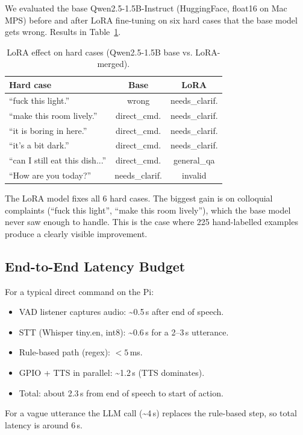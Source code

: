 \documentclass[conference]{IEEEtran}
\begin{document}
We evaluated the base Qwen2.5-1.5B-Instruct (HuggingFace, float16 on Mac MPS) before and after LoRA fine-tuning on six hard cases that the base model gets wrong. Results in Table~\ref{tab:lora}.

\begin{table}[h]
\centering
\caption{LoRA effect on hard cases (Qwen2.5-1.5B base vs. LoRA-merged).}
\label{tab:lora}
\renewcommand{\arraystretch}{1.15}
\begin{tabular}{lcc}
\toprule
\textbf{Hard case} & \textbf{Base} & \textbf{LoRA} \\
\midrule
``fuck this light.'' & wrong & needs\_clarif. \\
``make this room lively.'' & direct\_cmd. & needs\_clarif. \\
``it is boring in here.'' & direct\_cmd. & needs\_clarif. \\
``it's a bit dark.'' & direct\_cmd. & needs\_clarif. \\
``can I still eat this dish...'' & direct\_cmd. & general\_qa \\
``How are you today?'' & needs\_clarif. & invalid \\
\bottomrule
\end{tabular}
\end{table}

The LoRA model fixes all 6 hard cases. The biggest gain is on colloquial complaints (``fuck this light'', ``make this room lively''), which the base model never saw enough to handle. This is the case where 225 hand-labelled examples produce a clearly visible improvement.

\subsection{End-to-End Latency Budget}

For a typical direct command on the Pi:
\begin{itemize}
    \item VAD listener captures audio: \textasciitilde 0.5\,s after end of speech.
    \item STT (Whisper tiny.en, int8): \textasciitilde 0.6\,s for a 2--3\,s utterance.
    \item Rule-based path (regex): $<5$\,ms.
    \item GPIO + TTS in parallel: \textasciitilde 1.2\,s (TTS dominates).
    \item Total: about 2.3\,s from end of speech to start of action.
\end{itemize}
For a vague utterance the LLM call (\textasciitilde 4\,s) replaces the rule-based step, so total latency is around 6\,s.
\end{document}
